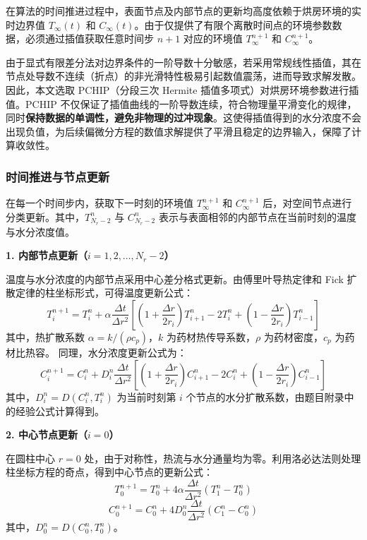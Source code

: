 \documentclass[withoutpreface,bwprint]{cumcm_thesis}
\begin{document}
在算法的时间推进过程中，表面节点及内部节点的更新均高度依赖于烘房环境的实时边界值 \(T_\infty(t)\) 和 \(C_\infty(t)\)。由于仅提供了有限个离散时间点的环境参数数据，必须通过插值获取任意时间步 \(n+1\) 对应的环境值 \(T_\infty^{n+1}\) 和 \(C_\infty^{n+1}\)。

由于显式有限差分法对边界条件的一阶导数十分敏感，若采用常规线性插值，其在节点处导数不连续（折点）的非光滑特性极易引起数值震荡，进而导致求解发散。因此，本文选取 PCHIP（分段三次 Hermite 插值多项式）对烘房环境参数进行插值。PCHIP 不仅保证了插值曲线的一阶导数连续，符合物理量平滑变化的规律，同时\textbf{保持数据的单调性，避免非物理的过冲现象}。这使得插值得到的水分浓度不会出现负值，为后续偏微分方程的数值求解提供了平滑且稳定的边界输入，保障了计算收敛性。

\subsubsection{时间推进与节点更新}

在每一个时间步内，获取下一时刻的环境值 \(T_\infty^{n+1}\) 和 \(C_\infty^{n+1}\) 后，对空间节点进行分类更新。其中，\(T_{N_r-2}^n\) 与 \(C_{N_r-2}^n\) 表示与表面相邻的内部节点在当前时刻的温度与水分浓度值。

\textbf{1. 内部节点更新（\(i = 1,2,\dots,N_r-2\)）}

温度与水分浓度的内部节点采用中心差分格式更新。由傅里叶导热定律和 Fick 扩散定律的柱坐标形式，可得温度更新公式：
\begin{equation}
T_i^{n+1} = T_i^n + \alpha \frac{\Delta t}{\Delta r^2} \left[ \left(1 + \frac{\Delta r}{2r_i}\right) T_{i+1}^n - 2T_i^n + \left(1 - \frac{\Delta r}{2r_i}\right) T_{i-1}^n \right]
\end{equation}
其中，热扩散系数 \(\alpha = k/(\rho c_p)\)，\(k\) 为药材热传导系数，\(\rho\) 为药材密度，\(c_p\) 为药材比热容。
同理，水分浓度更新公式为：
\begin{equation}
C_i^{n+1} = C_i^n + D_i^n \frac{\Delta t}{\Delta r^2} \left[ \left(1 + \frac{\Delta r}{2r_i}\right) C_{i+1}^n - 2C_i^n + \left(1 - \frac{\Delta r}{2r_i}\right) C_{i-1}^n \right]
\end{equation}
其中，\(D_i^n = D(C_i^n, T_i^n)\) 为当前时刻第 \(i\) 个节点的水分扩散系数，由题目附录中的经验公式计算得到。

\textbf{2. 中心节点更新（\(i = 0\)）}

在圆柱中心 \(r=0\) 处，由于对称性，热流与水分通量均为零。利用洛必达法则处理柱坐标方程的奇点，得到中心节点的更新公式：
\begin{equation}
T_0^{n+1} = T_0^n + 4\alpha \frac{\Delta t}{\Delta r^2} (T_1^n - T_0^n)
\end{equation}
\begin{equation}
C_0^{n+1} = C_0^n + 4D_0^n \frac{\Delta t}{\Delta r^2} (C_1^n - C_0^n)
\end{equation}
其中，\(D_0^n = D(C_0^n, T_0^n)\)。
\end{document}
